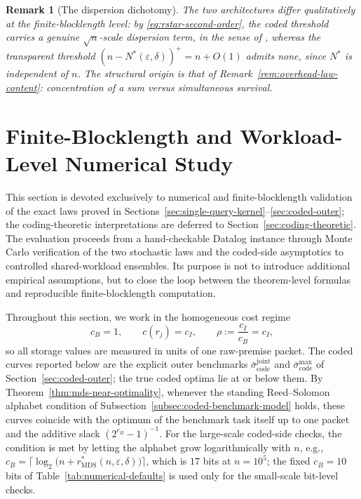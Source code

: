 \documentclass[journal]{IEEEtran}
\newtheorem{remark}{Remark}[section]
\numberwithin{equation}{section}
\begin{document}
\begin{remark}[The dispersion dichotomy]
\label{rem:coded-scaling}
The two architectures differ qualitatively at the finite-blocklength level:
by \eqref{eq:rstar-second-order}, the coded threshold carries a genuine
\(\sqrt n\)-scale dispersion term, in the sense of
\cite{polyanskiy2010channel,dembo2009large}, whereas the transparent
threshold
\((n-N^*(\varepsilon,\delta))^+=n+O(1)\) admits none, since \(N^*\) is
independent of \(n\).  The structural origin is that of
Remark~\ref{rem:overhead-law-content}: concentration of a sum versus
simultaneous survival.
\end{remark}

\section{Finite-Blocklength and Workload-Level Numerical Study}
\label{sec:numerical}

This section is devoted exclusively to numerical and finite-blocklength
validation of the exact laws proved in
Sections~\ref{sec:single-query-kernel}--\ref{sec:coded-outer}; the
coding-theoretic interpretations are deferred to
Section~\ref{sec:coding-theoretic}.  The evaluation proceeds from a
hand-checkable Datalog instance through Monte Carlo verification of the
two stochastic laws and the coded-side asymptotics to controlled
shared-workload ensembles.  Its purpose is not to introduce additional
empirical assumptions, but to close the loop between the theorem-level
formulas and reproducible finite-blocklength computation.

Throughout this section, we work in the homogeneous cost regime
\[
  c_B=1,
  \qquad
  c(r_j)=c_I,
  \qquad
  \rho:=\frac{c_I}{c_B}=c_I,
\]
so all storage values are measured in units of one raw-premise packet.  The
coded curves reported below are the explicit outer benchmarks
\(\bar{\sigma}_{\mathrm{code}}^{\mathrm{joint}}\) and
\(\bar{\sigma}_{\mathrm{code}}^{\max}\) of
Section~\ref{sec:coded-outer}; the true coded optima lie at or below them.
By Theorem~\ref{thm:mds-near-optimality}, whenever the standing
Reed--Solomon alphabet condition of
Subsection~\ref{subsec:coded-benchmark-model} holds, these curves coincide
with the optimum of the benchmark task itself up to one packet and the
additive slack \((2^{c_B}-1)^{-1}\).  For the large-scale coded-side
checks, the condition is met by letting the alphabet grow logarithmically
with \(n\), e.g.,
\(c_B=\bigl\lceil\log_2\bigl(n+r_{\mathrm{MDS}}^{*}(n,\varepsilon,\delta)
\bigr)\bigr\rceil\), which is \(17\) bits at \(n=10^{5}\); the fixed
\(c_B=10\) bits of Table~\ref{tab:numerical-defaults} is used only for the
small-scale bit-level checks.
\end{document}
